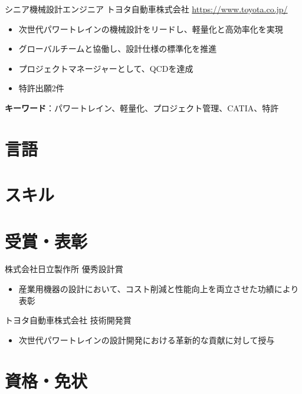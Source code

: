 \documentclass[a4paper, serif, 10pt]{moderncv}
\begin{document}
        {シニア機械設計エンジニア}
        {トヨタ自動車株式会社}
        {\url{https://www.toyota.co.jp/}}
        {}
        {\begin{itemize}
\item 次世代パワートレインの機械設計をリードし、軽量化と高効率化を実現
\item グローバルチームと協働し、設計仕様の標準化を推進
\item プロジェクトマネージャーとして、QCDを達成
\item 特許出願2件
\end{itemize}
\textbf{キーワード}：パワートレイン、軽量化、プロジェクト管理、CATIA、特許}
\section{言語}

\section{スキル}

\section{受賞・表彰}

        {株式会社日立製作所}
        {優秀設計賞}
        {}
        {}
        {\begin{itemize}
\item 産業用機器の設計において、コスト削減と性能向上を両立させた功績により表彰
\end{itemize}}

        {トヨタ自動車株式会社}
        {技術開発賞}
        {}
        {}
        {\begin{itemize}
\item 次世代パワートレインの設計開発における革新的な貢献に対して授与
\end{itemize}}
\section{資格・免状}
\end{document}
